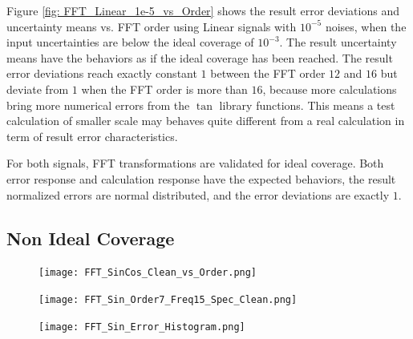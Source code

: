 \documentclass[twoside]{article}
\numberwithin{equation}{section}
\begin{document}
Figure \ref{fig:  FFT_Linear_1e-5_vs_Order}  shows the result error deviations and uncertainty means vs. FFT order using Linear signals with $10^{-5}$ noises, when the input uncertainties are below the ideal coverage of $10^{-3}$.
The result uncertainty means have the behaviors as if the ideal coverage has been reached.
The result error deviations reach exactly constant $1$ between the FFT order $12$ and $16$ but deviate from $1$ when the FFT order is more than $16$, because more calculations bring more numerical errors from the $\tan$ library functions.
This means a test calculation of smaller scale may behaves quite different from a real calculation in term of result error characteristics.

For both signals, FFT transformations are validated for ideal coverage.
Both error response and calculation response have the expected behaviors, the result normalized errors are normal distributed, and the error deviations are exactly $1$.




\subsection{Non Ideal Coverage}

\begin{figure}[p]
\centering
\texttt{[image: FFT\_SinCos\_Clean\_vs\_Order.png]} 
\label{fig: FFT_SinCos_Clean_vs_Order}
\end{figure}

\begin{figure}[p]
\centering
\texttt{[image: FFT\_Sin\_Order7\_Freq15\_Spec\_Clean.png]} 
\label{fig: FFT_Sin_Order7_Freq15_Spec_Clean}
\end{figure}

\begin{figure}[p]
\centering
\texttt{[image: FFT\_Sin\_Error\_Histogram.png]} 
\label{fig: FFT_Sin_Error_Histogram}
\end{figure}
\end{document}
